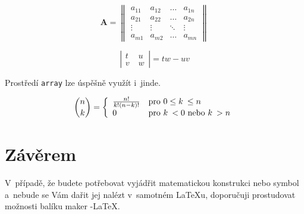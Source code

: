 \documentclass[a4paper, twocolumn, 11pt]{article}
\theoremstyle{definition}
\theoremstyle{plain}
\theoremstyle{plain}
\begin{document}
	$$\mathbf{A}=\left\|\begin{array}{cccc}
	a_{11} & a_{12} & \ldots & a_{1n} \\
	a_{21} & a_{22} & \ldots & a_{2n} \\
	\vdots & \vdots & \ddots & \vdots \\
	a_{m1} & a_{m2} & \ldots & a_{mn}
	\end{array}\right\|$$

	$$\left|\begin{array}{cl}
	t & u\: \\ v\; & w
	\end{array}\right| = tw -uv$$

	Prostředí \verb|array| lze úspěšně využít i~jinde.

	$$\binom{n}{k} = \left\{ 
	\begin{array}{l l}
	  \frac{n!}{k!(n-k)!} & \mbox{pro $0 \leq k\: \leq n$}\\
	  0 & \mbox{pro $k\: < 0$ nebo $k\: > n$}\\
	\end{array} \right. $$

	\section{Závěrem}
	V~případě, že budete potřebovat vyjádřit matematickou konstrukci nebo symbol a~nebude se Vám dařit jej nalézt v~samotném \LaTeX u, doporučuji prostudovat možnosti balíku maker \AmS-\LaTeX.
	
\end{document}
